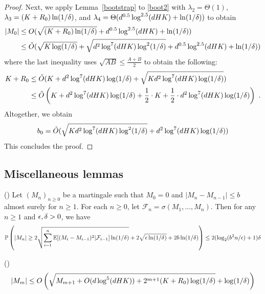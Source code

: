 \begin{proof}
Next, we apply Lemma~\ref{bootstrap} to \eqref{boot2} with $\lambda_2=\Theta(1)$, $\lambda_3 = (K+R_0)\ln(1/{\delta})$, and $\lambda_4 = \Theta(d^{0.5} \log^{2.5}(dHK) + \ln(1/{\delta}))$ to obtain
\begin{align*}
    |M_0| 
    &\le O(\sqrt{(K+R_0)\ln(1/{\delta})} + d^{0.5} \log^{2.5}(dHK) + \ln(1/{\delta}))
  \\&\le \tilde O(\sqrt{K\log(1/{\delta})} + \sqrt{d^{2}\log^{7}(dHK)\log^2(1/{\delta})} + d^{0.5} \log^{2.5}(dHK) + \ln(1/{\delta}))
\end{align*}
where the last inequality uses $\sqrt{AB} \le \frac{A+B}{2}$ to obtain the following:
\begin{align*}
    K + R_0 
      &\le \tilde O( K + d^{2}\log^{7}(dHK)\log (1/\dt)+\sqrt{K d^2\log^7(dHK)\log(1/\dt)} )
    \\&\le \tilde O\del{ K + d^{2}\log^{7}(dHK)\log (1/\dt) + \fr12\cd K + \fr12\cd d^{2}\log^{7}(dHK)\log (1/\dt) }~.
\end{align*}
Altogether, we obtain
\begin{align*}
    b_0 = \tilde O( \sqrt{K d^2\log^7(dHK)\log^2(1/{\delta})} + d^{2}\log^{7}(dHK)\log (1/{\delta}) )
\end{align*}
This concludes the proof.

\end{proof}


\subsection{Miscellaneous lemmas}

\begin{lemma}\label{ineq}(\citet[Lemma 11]{zhang2021model})
  Let $(M_n)_{n\geq0}$ be a martingale such that $M_0=0$ and $|M_n-M_{n-1}| \leq b$ almost surely for $n\geq1$. For each $n\geq 0$, let $\mathcal{F}_n=\sigma(M_1,...,M_n)$. Then for any $n \geq 1$ and $\epsilon,\delta>0$, we have
  \begin{equation*}
      \mathbb{P}\del{|M_n|\geq 2 \sqrt{ \sum_{i=1}^n \mathbb{E}[(M_{i}-M_{i-1})^2|\mathcal{F}_{i-1}] \ln(1/\delta)}+2\sqrt{\eps \ln(1/\delta)}+2 b \ln(1/\delta)} \leq 2(\log_2(b^2 n/\eps) +1)\delta
  \end{equation*}
\end{lemma}

\begin{lemma}\label{lem-M}(\citet[Lemma 25]{zhang21variance})
\begin{align*}
  |M_m| \le O\del{\sqrt{M_{m+1}+O(d\log^5(dHK))+2^{m+1}(K+R_0)\log(1/\delta)}+\log(1/\delta)}
\end{align*}
\end{lemma}

